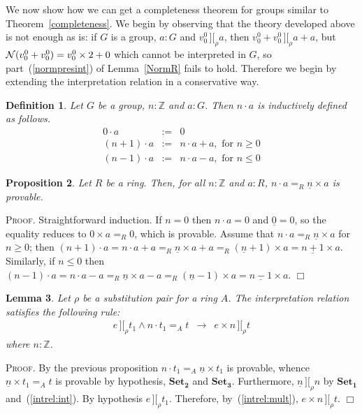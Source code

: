 \documentclass{article}
\newtheorem{definition}{Definition}[section]
\newtheorem{lemma}[definition]{Lemma}
\newtheorem{proposition}[definition]{Proposition}
\newenvironment{proof}{\smallskip\textsc{Proof.}}{\hspace*{\fill}$\Box$}
\newcommand{\intII}{\,]\![}
\newcommand{\intrel}{\mathbin{\intII_{\rho}}}
\newcommand{\N}{{\cal N}}
\newcommand{\Z}{{\mathbb Z}}
\newcommand{\axiom}[1]{\ensuremath{\mathbf{#1}}}
\newcommand{\iter}[2]{\ensuremath{{#1}\cdot{#2}}}
\begin{document}
We now show how we can get a completeness theorem for groups similar
to Theorem~\ref{completeness}.  We begin by observing that the theory
developed above is not enough as is: if $G$ is a group, $a:G$ and
$v^0_0\intrel a$, then $v^0_0+v^0_0\intrel a+a$, but
$\N(v^0_0+v^0_0)=v^0_0\times 2+0$ which cannot be interpreted in $G$,
so part~(\ref{normpresint}) of Lemma~\ref{NormR} fails to hold.
Therefore we begin by extending the interpretation relation in a
conservative way.

\begin{definition}\label{defn:iter} Let $G$ be a group, $n:\Z$ and $a:G$.
Then {\iter na} is inductively defined as follows.
\begin{eqnarray}
\label{iter:0}
 \iter0a & := & 0\\
\label{iter:pos}
 \iter{(n+1)}a & := & \iter na+a, \mbox{ for $n\geq 0$}\\
\label{iter:neg}
 \iter{(n-1)}a & := & \iter na-a, \mbox{ for $n\leq 0$}
\end{eqnarray}
\end{definition}

\begin{proposition} Let $R$ be a ring.  Then, for all $n:\Z$ and $a:R$,
$\iter na=_R \underline n\times a$ is provable.
\end{proposition}
\begin{proof}
Straightforward induction.  If $n=0$ then $\iter na=0$ and $\underline0=0$,
so the equality reduces to $0\times a=_R 0$, which is provable.
Assume that $\iter na=_R\underline n\times a$ for $n\geq 0$; then
$\iter{(n+1)}a%
=\iter na+a%
=_R\underline n \times a+a%
=_R(\underline n+1) \times a%
=\underline{n+1} \times a$.
Similarly, if $n\leq 0$ then
$\iter{(n-1)}a%
=\iter na-a%
=_R\underline n \times a-a%
=_R(\underline n-1) \times a%
=\underline{n-1} \times a$.
\end{proof}

\begin{lemma}\label{intrel:iterprop} Let $\rho$ be a substitution pair for
a ring $A$.  The interpretation relation satisfies the following rule:
\begin{eqnarray*}
e\intrel t_1 \wedge \iter n{t_1}=_A t & \rightarrow & e\times n\intrel t
\end{eqnarray*}
where $n:\Z$.
\end{lemma}
\begin{proof} By the previous proposition
$\iter n{t_1}=_A \underline n\times t_1$ is provable, whence
$\underline n\times t_1=_A t$ is provable by hypothesis, \axiom{Set_2} and
\axiom{Set_3}.  Furthermore, $\underline n\intrel n$ by \axiom{Set_1}
and~(\ref{intrel:int}).  By hypothesis $e\intrel t_1$.  Therefore,
by~(\ref{intrel:mult}), $e\times n\intrel t$.
\end{proof}
\end{document}
